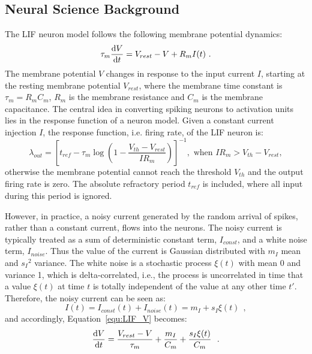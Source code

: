 \subsection{Neural Science Background}
	The LIF neuron model follows the following membrane potential dynamics:
	\begin{equation}
	\tau_m \frac{\mathrm{d} V}{\mathrm{d} t}=V_{rest} - V + R_{m} I(t) ~.
	\label{equ:LIF_V}
	\end{equation}
	The membrane potential $V$ changes in response to the input current $I$, starting at the resting membrane potential $V_{rest}$, where the membrane time constant is $\tau_m = R_mC_m$, $R_m$ is the membrane resistance and $C_m$ is the membrane capacitance.
	The central idea in converting spiking neurons to activation units lies in the response function of a neuron model.
	Given a constant current injection $I$, the response function, i.e. firing rate, of the LIF neuron is:
	\begin{equation}
	\lambda_\mathit{out}=
	\left [ t_\mathit{ref}-\tau_m\log \left ( 1-\frac{V_{th}-V_\mathit{rest}}{IR_m}  \right )\right ]^{-1}, \textrm{~when~} IR_m>V_{th}-V_{rest},
	\label{equ:consI}
	\end{equation}
	otherwise the membrane potential cannot reach the threshold $V_{th}$ and the output firing rate is zero. 
	The absolute refractory period $t_\mathit{ref}$ is included, where all input during this period is ignored.
	
	However, in practice, a noisy current generated by the random arrival of spikes, rather than a constant current, flows into the neurons.
	The noisy current is typically treated as a sum of deterministic constant term, $I_{const}$, and a white noise term, $I_{noise}$.
	Thus the value of the current is Gaussian distributed with $m_I$ mean and ${s_I}^2$ variance.
	The white noise is a stochastic process $\xi(t)$ with mean 0 and variance 1, which is delta-correlated, i.e., the process is uncorrelated in time that a value $\xi(t)$ at time $t$ is totally independent of the value at any other time $t'$.
	Therefore, the noisy current can be seen as:
	\begin{equation}
	I(t) = I_{const}(t)+I_{noise}(t) = m_I + s_I\xi(t)~~,
	\label{equ:noisyI}
	\end{equation}
	and accordingly, Equation~\ref{equ:LIF_V} becomes:
	\begin{equation}
	\frac{\mathrm{d} V}{\mathrm{d} t}=\frac{V_{rest} - V}{\tau_m } + \frac{m_I}{C_m} + \frac{s_I\xi(t)}{C_m}~~.
	\label{equ:LIF_V2}
	\end{equation}
	
